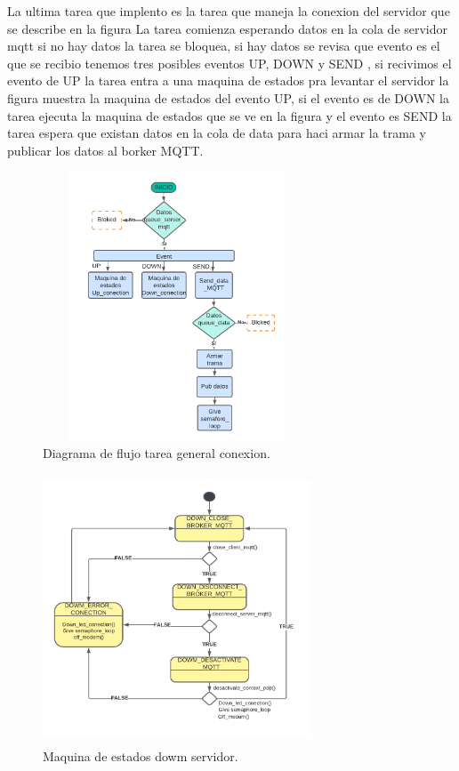 La ultima tarea que implento es la tarea que maneja la conexion del servidor que se describe en la figura 
La tarea comienza esperando datos en la cola de servidor mqtt si no hay datos la tarea se bloquea, si hay datos se revisa que evento es el que se recibio tenemos tres posibles eventos UP, DOWN y SEND ,
si recivimos el evento de UP la tarea entra a una maquina de estados pra levantar el servidor la figura muestra la maquina de estados del evento UP, si el evento es de DOWN la tarea ejecuta la maquina de estados que se ve en la figura y el evento es SEND la tarea espera que existan datos en la cola de data para haci armar la trama y publicar los datos al borker MQTT.

\begin{figure}[h]
  \centering
	\includegraphics[width=8cm, height=8cm]{./Figures/DF general task conection.png}
	\caption{Diagrama de flujo tarea general conexion.}
	\label{fig:Df tarea conexion}
\end{figure}

\begin{figure}[h]
  \centering
  \includegraphics[width=8cm, height=8cm]{./Figures/SM down server.png}
  \caption{Maquina de estados dowm servidor.}
  \label{fig:Maquina de estados dowm servidor}
\end{figure}

